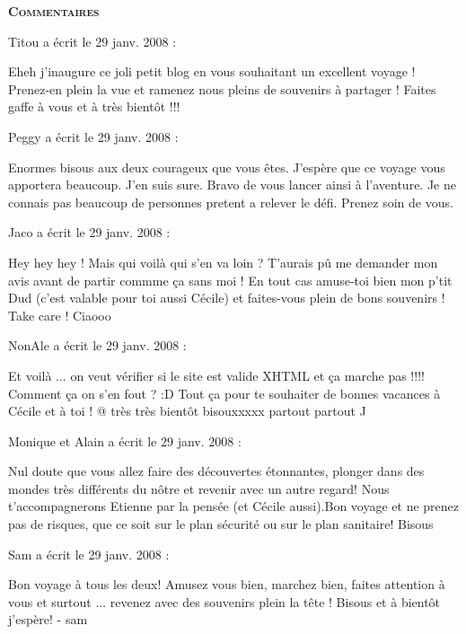 \bigskip
\textbf{\textsc{Commentaires}}

 \medskip
Titou a écrit le 29 janv. 2008 :
\begin{displayquote}
Eheh j'inaugure ce joli petit blog en vous souhaitant un excellent voyage ! Prenez-en plein la vue et ramenez nous pleins de souvenirs à partager ! Faites gaffe à vous et à très bientôt !!!
\end{displayquote}

 \medskip
Peggy a écrit le 29 janv. 2008 :
\begin{displayquote}
Enormes bisous aux deux courageux que vous êtes. J'espère que ce voyage vous apportera beaucoup. J'en suis sure. Bravo de vous lancer ainsi à l'aventure. Je ne connais pas beaucoup de personnes pretent a relever le défi. Prenez soin de vous.
\end{displayquote}

 \medskip
Jaco a écrit le 29 janv. 2008 :
\begin{displayquote}
Hey hey hey !
Mais qui voilà qui s'en va loin ? T'aurais pû me demander mon avis avant de partir commme ça sans moi !
En tout cas amuse-toi bien mon p'tit Dud (c'est valable pour toi aussi Cécile) et faites-vous plein de bons souvenirs !
Take care !
Ciaooo
\end{displayquote}

 \medskip
NonAle a écrit le 29 janv. 2008 :
\begin{displayquote}
Et voilà ... on veut vérifier si le site est valide XHTML et ça marche pas !!!! Comment ça on s'en fout ? :D
Tout ça pour te souhaiter de bonnes vacances à Cécile et à toi ! 
@ très très bientôt 
bisouxxxxx partout partout ^^
\end{displayquote}

 \medskip
Monique et Alain a écrit le 29 janv. 2008 :
\begin{displayquote}
Nul doute que vous allez faire des découvertes étonnantes, plonger dans des mondes très différents du nôtre et revenir avec un autre regard! Nous t'accompagnerons Etienne par la pensée (et Cécile aussi).Bon voyage et ne prenez pas de risques, que ce soit sur le plan sécurité ou sur le plan sanitaire!
Bisous
\end{displayquote}

 \medskip
Sam a écrit le 29 janv. 2008 :
\begin{displayquote}
Bon voyage à tous les deux!
Amusez vous bien, marchez bien, faites attention à vous et surtout ... revenez avec des souvenirs plein la tête !
Bisous et à bientôt j'espère!
- sam
\end{displayquote}

